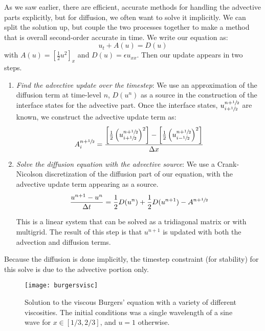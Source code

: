 As we saw earlier, there are efficient, accurate methods for handling
the advective parts explicitly, but for diffusion, we often want to
solve it implicitly.  We can split the solution up, but couple the
two processes together to make a method that is overall second-order
accurate in time.  We write our equation as:
\begin{equation}
u_t + A(u) = D(u)
\end{equation}
with $A(u) = [\frac{1}{2} u^2]_x$ and $D(u) = \epsilon u_{xx}$.  Then our update
appears in two steps.
\begin{enumerate}
\item {\em Find the advective update over the timestep}:
   We use an approximation of the diffusion term at time-level $n$, $D(u^n)$
   as a source in the construction of the interface states for the
   advective part.  Once the interface states, $u_{i+{\sfrac{1}{2}}}^{n+{\sfrac{1}{2}}}$ are
   known, we construct the advective update term as:
   \begin{equation}
   A_i^{n+{\sfrac{1}{2}}} =
     \frac{\left [ \frac{1}{2} \left (u_{i+{\sfrac{1}{2}}}^{n+{\sfrac{1}{2}}}\right)^2\right ] -
           \left [ \frac{1}{2} \left (u_{i-{\sfrac{1}{2}}}^{n+{\sfrac{1}{2}}}\right)^2\right ]}
          {\Delta x}
    \end{equation}

\item {\em Solve the diffusion equation with the advective source}:
    We use a Crank-Nicolson discretization of the diffusion part of
    our equation, with the advective update term appearing as a source.
    \begin{equation}
    \frac{u^{n+1} - u^n}{\Delta t} =
        \frac{1}{2}D(u^n) + \frac{1}{2}D(u^{n+1}) - A^{n+{\sfrac{1}{2}}}
    \end{equation}

    This is a linear system that can be solved as a tridiagonal matrix
    or with multigrid.  The result of this step is that $u^{n+1}$ is
    updated with both the advection and diffusion terms.

\end{enumerate}

Because the diffusion is done implicitly, the timestep constraint (for
stability) for this solve is due to the advective portion only.

\begin{figure}[t]
\centering
\texttt{[image: burgersvisc]}
\caption[Viscous Burgers' equation solution]
  {\label{fig:viscburger} Solution to the viscous Burgers' equation
  with a variety of different viscosities.  The initial conditions was
  a single wavelength of a sine wave for $x \in [1/3,2/3]$, and $u = 1$
  otherwise. \\
  }
\end{figure}

